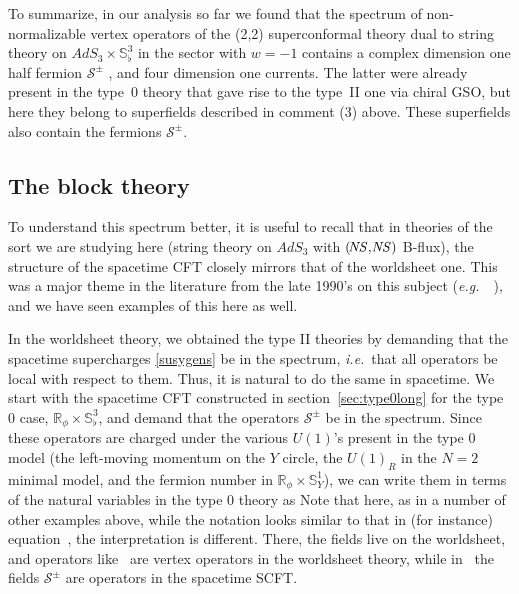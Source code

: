 \documentclass[12pt]{article}
\def\sqsphere{{\bS^3_\flat}}
\def\ie{{i.e.}}
\def\eg{{e.g.}}
\def\NS{{\it \!NS}}
\newcommand{\bR}{{\mathbb R}}
\newcommand{\bS}{{\mathbb S}}
\numberwithin{equation}{section}
\def\cS{\mathcal {S}} \def\cT{\mathcal {T}} \def\cU{\mathcal {U}}
\def\ie{{\it i.e.}}
\def\eg{{\it e.g.}}
\def\exp{{\rm exp}}
\def\ie{{\it i.e.}}
\def\eg{{\it e.g.}}
\begin{document}
\noindent
To summarize, in our analysis so far we found that the spectrum of non-normalizable vertex operators of the (2,2) superconformal theory dual to string theory on $AdS_3\times \sqsphere$ in the sector with $w=-1$ contains a complex dimension one half fermion $\cS^\pm$ \blockferm, and four dimension one currents. The latter were already present in the type~0 theory that gave rise to the type~II one via chiral GSO, but here they belong to superfields described in comment (3) above. These superfields also contain the fermions $\cS^\pm$. 




\subsection{The block theory}
\label{sec:blocktheory}



To understand this spectrum better, it is useful to recall that in theories of the sort we are studying here (string theory on $AdS_3$ with $(\NS,\NS)$ B-flux), the structure of the spacetime CFT closely mirrors that of the worldsheet one. This was a major theme in the literature from the late 1990's on this subject (\eg\ ~), and we have seen examples of this here as well.

In the worldsheet theory, we obtained the type II theories by demanding that the spacetime supercharges \eqref{susygens} be in the spectrum, \ie\ that all operators be local with respect to them. Thus, it is natural to do the same in spacetime. We start with the spacetime CFT constructed in section~\ref{sec:type0long} for the type 0 case, $\bR_\phi\times\sqsphere$, and demand that the operators $\cS^\pm$ be in the spectrum. Since these operators are charged under the various $U(1)$'s present in the type 0 model (the left-moving momentum on the $Y$ circle, the $U(1)_R$ in the $N=2$ minimal model, and the fermion number in $\bR_\phi\times\bS^1_Y$), we can write them in terms of the natural variables in the type 0 theory as
\eqn[Spmcandidate]{
\cS^\pm = \exp\Big[ \pm \frac i2 \Big( -H_3 + a\, Z + \sqrt{\frac2k}\, Y\Big) \Big] ~.
}
Note that here, as in a number of other examples above, while the notation looks similar to that in (for instance) equation~\susygens, the interpretation is different. There, the fields live on the worldsheet, and operators like \susygens\ are vertex operators in the worldsheet theory, while in \Spmcandidate\ the fields $\cS^\pm$ are operators in the spacetime SCFT.
\end{document}
